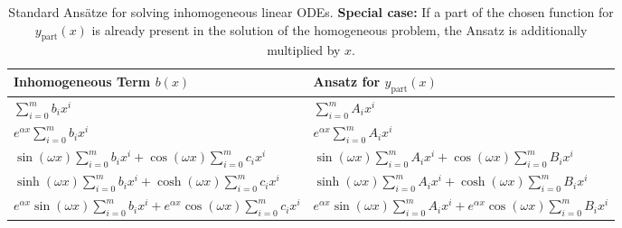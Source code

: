 \begin{table}[ht]
  \centering
  \begin{tabular}{ll}
    \toprule
    \textbf{Inhomogeneous Term} $b(x)$ & \textbf{Ansatz for} $y_{\text{part}}(x)$ \\
    \midrule
    $\sum_{i=0}^m b_i x^i$ & $\sum_{i=0}^m A_i x^i$ \\
    $e^{\alpha x} \sum_{i=0}^m b_i x^i$ & $e^{\alpha x} \sum_{i=0}^m A_i x^i$ \\
    $\sin(\omega x) \sum_{i=0}^m b_i x^i + \cos(\omega x) \sum_{i=0}^m c_i x^i$ & $\sin(\omega x) \sum_{i=0}^m A_i x^i + \cos(\omega x) \sum_{i=0}^m B_i x^i$ \\
    $\sinh(\omega x) \sum_{i=0}^m b_i x^i + \cosh(\omega x) \sum_{i=0}^m c_i x^i$ & $\sinh(\omega x) \sum_{i=0}^m A_i x^i + \cosh(\omega x) \sum_{i=0}^m B_i x^i$ \\
    $e^{\alpha x} \sin(\omega x) \sum_{i=0}^m b_i x^i + e^{\alpha x} \cos(\omega x) \sum_{i=0}^m c_i x^i$ & $e^{\alpha x} \sin(\omega x) \sum_{i=0}^m A_i x^i + e^{\alpha x} \cos(\omega x) \sum_{i=0}^m B_i x^i$ \\
    \bottomrule
  \end{tabular}
  \caption{Standard Ansätze for solving inhomogeneous linear ODEs. \textbf{Special case:} If a part of the chosen function for $y_{\text{part}}(x)$ is already present in the solution of the homogeneous problem, the Ansatz is additionally multiplied by $x$.}
  \label{tab:ode_ansatz}
\end{table}

